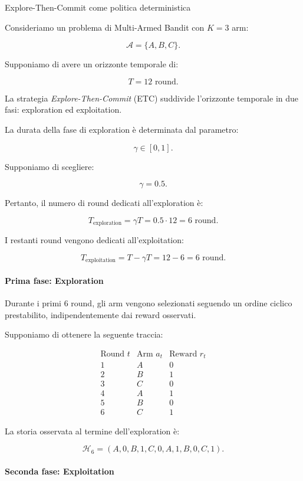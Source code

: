 \begin{example}{Explore-Then-Commit come politica deterministica}

Consideriamo un problema di Multi-Armed Bandit con $K=3$ arm:

\[
\mathcal A=\{A,B,C\}.
\]

Supponiamo di avere un orizzonte temporale di:

\[
T=12 \text{ round}.
\]

La strategia \textit{Explore-Then-Commit} (ETC) suddivide
l'orizzonte temporale in due fasi: exploration ed exploitation.

La durata della fase di exploration è determinata dal parametro:

\[
\gamma\in[0,1].
\]

Supponiamo di scegliere:

\[
\gamma=0.5.
\]

Pertanto, il numero di round dedicati all'exploration è:

\[
T_{\mathrm{exploration}}
=\gamma T
=0.5\cdot12
=\boxed{6\text{ round}}.
\]

I restanti round vengono dedicati all'exploitation:

\[
T_{\mathrm{exploitation}}
=T-\gamma T
=12-6
=\boxed{6\text{ round}}.
\]

\paragraph{Prima fase: Exploration}

Durante i primi $6$ round, gli arm vengono selezionati
seguendo un ordine ciclico prestabilito, indipendentemente
dai reward osservati.

Supponiamo di ottenere la seguente traccia:

\[
\begin{array}{c|c|c}
\text{Round }t & \text{Arm }a_t & \text{Reward }r_t\\
\hline
1 & A & 0\\
2 & B & 1\\
3 & C & 0\\
4 & A & 1\\
5 & B & 0\\
6 & C & 1
\end{array}
\]

La storia osservata al termine dell'exploration è:

\[
\mathcal H_6=
(A,0,B,1,C,0,A,1,B,0,C,1).
\]


\paragraph{Seconda fase: Exploitation}


\end{example}
